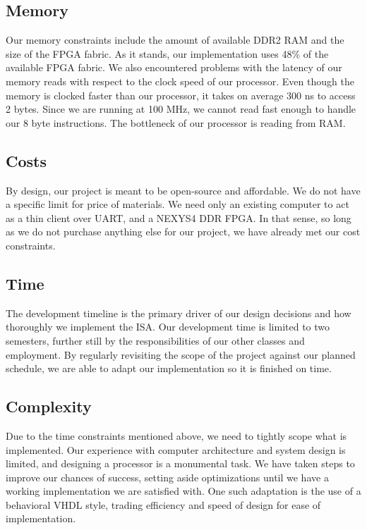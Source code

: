 \documentclass{article}
\begin{document}
\subsection{Memory}
  Our memory constraints include the amount of available DDR2 RAM and the size of the FPGA fabric.  As it stands, our implementation uses 48\% of the available FPGA fabric.  We also encountered problems with the latency of our memory reads with respect to the clock speed of our processor.  Even though the memory is clocked faster than our processor, it takes on average 300 ns to access 2 bytes. Since we are running at 100 MHz, we cannot read fast enough to handle our 8 byte instructions.  The bottleneck of our processor is reading from RAM.

\subsection{Costs}
By design, our project is meant to be open-source and affordable.  We do not have a specific limit for price of materials.  We need only an existing computer to act as a thin client over UART, and a NEXYS4 DDR FPGA. In that sense, so long as we do not purchase anything else for our project, we have already met our cost constraints.
  
\subsection{Time}
The development timeline is the primary driver of our design decisions and how thoroughly we implement the ISA. Our development time is limited to two semesters, further still by the responsibilities of our other classes and employment.  By regularly revisiting the scope of the project against our planned schedule, we are able to adapt our implementation so it is finished on time.

\subsection{Complexity}
Due to the time constraints mentioned above, we need to tightly scope what is implemented. Our experience with computer architecture and system design is limited, and designing a processor is a monumental task.  We have taken steps to improve our chances of success, setting aside optimizations until we have a working implementation we are satisfied with.  One such adaptation is the use of a behavioral VHDL style, trading efficiency and speed of design for ease of implementation.
\end{document}
